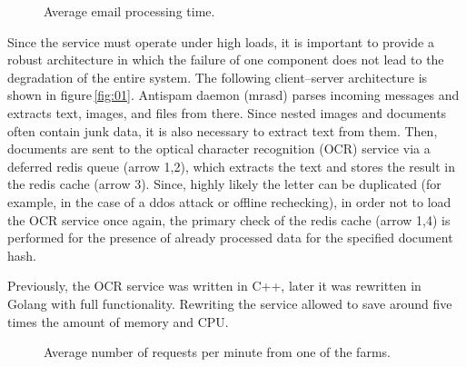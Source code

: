 \documentclass[12pt]{jpconf}
\begin{document}
\begin{figure}[b]
\centering
{}
\caption{\label{fig:02} Average email processing time.}
\end{figure}

Since the service must operate under high loads, it is important to provide a robust architecture in which the failure of one component does not lead to the degradation of the entire system. The following client--server architecture is shown in figure\,\ref{fig:01}. Antispam daemon (mrasd) parses incoming messages and extracts text, images, and files from there. Since nested images and documents often contain junk data, it is also necessary to extract text from them. Then, documents are sent to the optical character recognition (OCR) service via a deferred redis queue (arrow 1,2), which extracts the text and stores the result in the redis cache (arrow 3).
Since, highly likely the letter can be duplicated (for example, in the case of a ddos attack or offline rechecking), in order not to load the OCR service once again, the primary check of the redis cache (arrow 1,4) is performed for the presence of already processed data for the specified document hash.

Previously, the OCR service was written in C++, later it was rewritten in Golang with full functionality. Rewriting the service allowed to save around five times the amount of memory and CPU.
 
\begin{figure}[t!]
\centering
{}
\caption{\label{fig:03} Average number of requests per minute from one of the farms.}
\end{figure}
\end{document}
